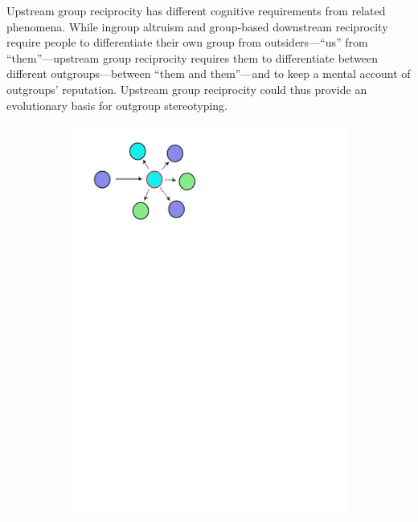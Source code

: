 \documentclass[12pt,a4paper]{article}\usepackage[]{graphicx}\usepackage[]{color}
\begin{document}
Upstream group reciprocity has different cognitive requirements from
related phenomena. While ingroup altruism and group-based downstream
reciprocity require people to differentiate their own group from
outsiders---``us'' from ``them''---upstream group reciprocity requires them to
differentiate between different outgroups---between ``them and them''---and to
keep a mental account of outgroups' reputation. Upstream group reciprocity could
thus provide an evolutionary basis for outgroup stereotyping.

\begin{figure}
	\begin{center}
        \begin{subfigure}[b]{0.4\textwidth}
		  \includegraphics[width=\textwidth]{upstream.pdf}
            \caption{}\label{upstream}
        \end{subfigure}
        \qquad
        \begin{subfigure}[b]{0.4\textwidth}

\end{subfigure}
\end{center}
\end{figure}
\end{document}
